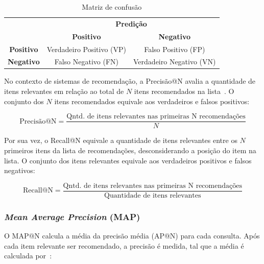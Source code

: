   \begin{table}[H]
    \centering
    \begin{tabular}{c|c|c|}
      \cline{2-3}
      & \multicolumn{2}{c|}{\textbf{Predição}} \\ \cline{2-3} 
      & \textbf{Positivo} & \textbf{Negativo} \\ \hline
      \multicolumn{1}{|c|}{\textbf{Positivo}} & Verdadeiro Positivo (VP) & Falso Positivo (FP) \\ \hline
      \multicolumn{1}{|c|}{\textbf{Negativo}} & Falso Negativo (FN) & Verdadeiro Negativo (VN) \\ \hline
    \end{tabular}
    \caption{Matriz de confusão}
    \label{tab:confusion_matrix}
  \end{table}

  No contexto de sistemas de recomendação, a Precisão@N avalia a quantidade de
  itens relevantes em relação ao total de $N$ itens recomendados na lista~\cite{sessionbaseddp}. O conjunto
  dos $N$ itens recomendados equivale aos verdadeiros e falsos positivos:

  \begin{equation}
    \text{Precisão@N} = \frac{\text{Qntd. de itens relevantes nas primeiras N recomendações}}{N}
  \end{equation}

  Por sua vez, o Recall@N equivale a quantidade de itens relevantes entre
  os $N$ primeiros itens da lista de recomendações, desconsiderando a
  posição do item na lista. O conjunto dos itens relevantes equivale
  aos verdadeiros positivos e falsos negativos:

  \begin{equation}
    \text{Recall@N} = \frac{\text{Qntd. de itens relevantes nas primeiras N recomendações}}{\text{Quantidade de itens relevantes}}
  \end{equation}

  \subsubsection{\textit{Mean Average Precision} (MAP)} O MAP@N calcula a média
  da precisão média (AP@N) para cada consulta. Após cada item relevante ser
  recomendado, a precisão é medida, tal que a média é calculada por~\cite{carnevali2023offline}:

